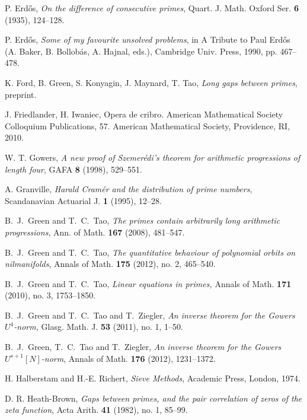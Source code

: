 \documentclass[12pt]{amsart}
\numberwithin{equation}{section}  %
\theoremstyle{remark}
\theoremstyle{plain}
\numberwithin{equation}{section}
\renewcommand{\(}{\left(}
\renewcommand{\)}{\right)}
\begin{document}
\begin{thebibliography}{999}
 P. Erd\H{o}s, \emph{On the difference of consecutive primes}, Quart. J. Math. Oxford Ser. \textbf{6} (1935), 124--128.

 P. Erd\H os, {\it Some of my favourite unsolved problems}, in
A Tribute to Paul Erd\H os (A. Baker, B. Bollob\'as, A. Hajnal, eds.), Cambridge Univ. Press, 1990, pp. 467--478.

K. Ford, B. Green, S. Konyagin, J. Maynard, T. Tao, \emph{Long gaps between primes}, preprint.

J. Friedlander, H. Iwaniec, Opera de cribro. American Mathematical Society Colloquium Publications, 57. American Mathematical Society, Providence, RI, 2010.

W. T. Gowers, \emph{A new proof of Szemer\'edi's theorem for arithmetic progressions of length four}, GAFA \textbf{8} (1998), 529--551.

 A. Granville, \emph{Harald Cram\'er and the distribution of
prime numbers}, Scandanavian Actuarial J. \textbf{1}  (1995), 12--28.

 B.~J.~Green and T.~C.~Tao, \emph{The primes contain arbitrarily long arithmetic progressions}, Ann. of Math. \textbf{167} (2008), 481--547.

 B.~J.~Green and T.~C.~Tao, \emph{The quantitative behaviour of polynomial orbits on nilmanifolds}, Annals of Math. \textbf{175} (2012), no. 2, 465--540.

 B.~J.~Green and T.~C.~Tao, \emph{Linear equations in primes,} Annals of Math. \textbf{171} (2010), no. 3, 1753--1850.

 B.~J.~Green and T.~C.~Tao and T.~Ziegler, \emph{An inverse theorem for the Gowers $U^4$-norm,} Glasg. Math. J. \textbf{53} (2011), no. 1, 1--50. 

  B.~J.~Green, T.~C.~Tao and T.~Ziegler, 
\emph{An inverse theorem for the Gowers $U^{s+1}[N]$-norm},
Annals of Math. \textbf{176} (2012), 1231--1372.

 H. Halberstam and H.-E. Richert, \textit{Sieve Methods},
Academic Press, London, 1974.


D. R. Heath-Brown, \emph{Gaps between primes, and the pair correlation of zeros of the zeta function}, Acta Arith. \textbf{41} (1982), no. 1, 85--99.


\end{thebibliography}
\end{document}
